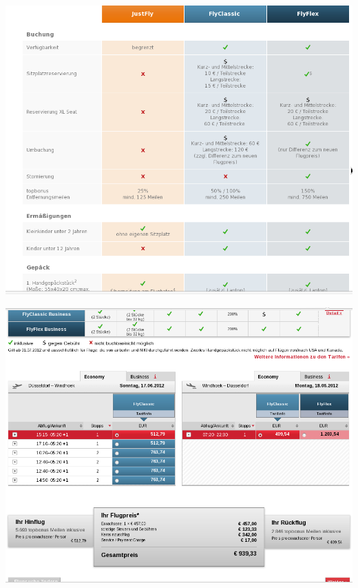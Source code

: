 \documentclass[11pt]{article}
\begin{document}






\includegraphics[scale=0.45]{Flug_Air_Berlin/Bildschirmfoto_am_2012-06-13_14_47_20.png} 

\includegraphics[scale=0.45]{Flug_Air_Berlin/Bildschirmfoto_am_2012-06-13_14_47_22.png} 
\end{document}
